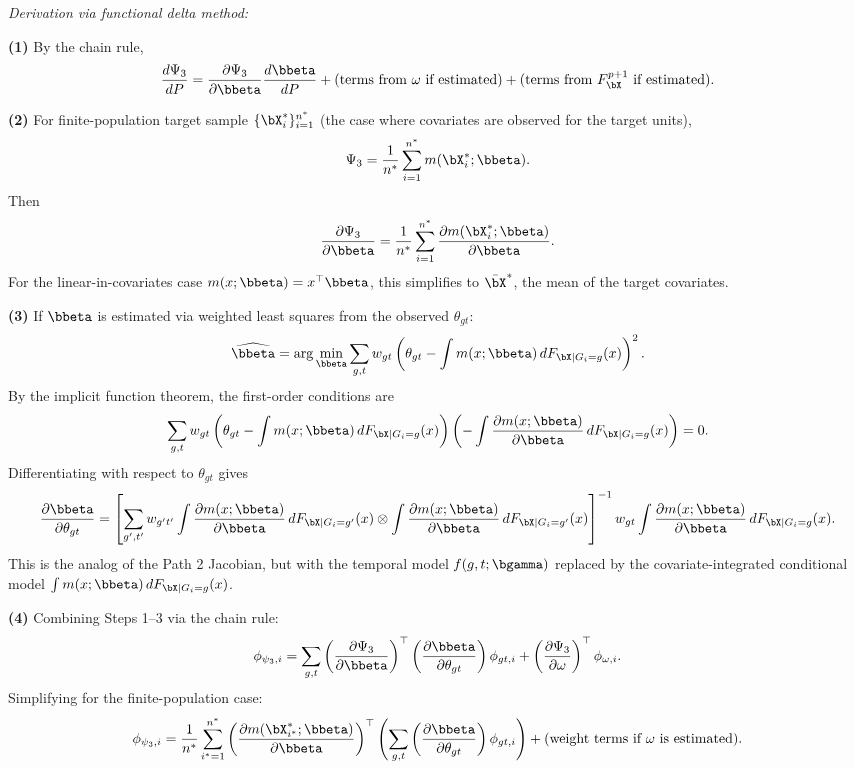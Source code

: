 \documentclass{article}
\begin{document}
\textit{Derivation via functional delta method:}

\textbf{(1)} By the chain rule,
\[
\frac{d\Psi_3}{dP} = \frac{\partial \Psi_3}{\partial \bbeta} \frac{d\bbeta}{dP} + \text{(terms from } \omega \text{ if estimated)} + \text{(terms from } F_{\bX}^{p+1} \text{ if estimated)}.
\]

\textbf{(2)} For finite-population target sample $\{\bX_i^*\}_{i=1}^{n^*}$ (the case where covariates are observed for the target units),
\[
\Psi_3 = \frac{1}{n^*} \sum_{i=1}^{n^*} m(\bX_i^*; \bbeta).
\]
Then
\[
\frac{\partial \Psi_3}{\partial \bbeta} = \frac{1}{n^*} \sum_{i=1}^{n^*} \frac{\partial m(\bX_i^*; \bbeta)}{\partial \bbeta}.
\]
For the linear-in-covariates case $m(x;\bbeta) = x^\top \bbeta$, this simplifies to $\bar{\bX}^*$, the mean of the target covariates.

\textbf{(3)} If $\bbeta$ is estimated via weighted least squares from the observed $\theta_{gt}$:
\[
\widehat{\bbeta} = \arg\min_{\bbeta} \sum_{g,t} w_{gt} \left( \theta_{gt} - \int m(x;\bbeta) \, dF_{\bX | G_i=g}(x) \right)^2.
\]
By the implicit function theorem, the first-order conditions are
\[
\sum_{g,t} w_{gt} \left( \theta_{gt} - \int m(x;\bbeta) \, dF_{\bX | G_i=g}(x) \right) \left( -\int \frac{\partial m(x;\bbeta)}{\partial \bbeta} \, dF_{\bX | G_i=g}(x) \right) = 0.
\]
Differentiating with respect to $\theta_{gt}$ gives
\[
\frac{\partial \bbeta}{\partial \theta_{gt}} = \left[\sum_{g',t'} w_{g't'} \int \frac{\partial m(x;\bbeta)}{\partial \bbeta} \, dF_{\bX | G_i=g'}(x) \otimes \int \frac{\partial m(x;\bbeta)}{\partial \bbeta} \, dF_{\bX | G_i=g'}(x) \right]^{-1} w_{gt} \int \frac{\partial m(x;\bbeta)}{\partial \bbeta} \, dF_{\bX | G_i=g}(x).
\]
This is the analog of the Path 2 Jacobian, but with the temporal model $f(g,t;\bgamma)$ replaced by the covariate-integrated conditional model $\int m(x;\bbeta) \, dF_{\bX|G_i=g}(x)$.

\textbf{(4)} Combining Steps 1--3 via the chain rule:
\[
\phi_{\psi_3,i} = \sum_{g,t} \left(\frac{\partial \Psi_3}{\partial \bbeta}\right)^\top \left(\frac{\partial \bbeta}{\partial \theta_{gt}}\right) \phi_{gt,i} + \left(\frac{\partial \Psi_3}{\partial \omega}\right)^\top \phi_{\omega,i}.
\]
Simplifying for the finite-population case:
\[
\phi_{\psi_3,i} = \frac{1}{n^*} \sum_{i^*=1}^{n^*} \left(\frac{\partial m(\bX_{i^*}^*; \bbeta)}{\partial \bbeta}\right)^\top \left(\sum_{g,t} \left(\frac{\partial \bbeta}{\partial \theta_{gt}}\right) \phi_{gt,i}\right) + \text{(weight terms if } \omega \text{ is estimated)}.
\]
\end{document}
